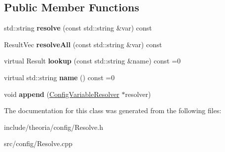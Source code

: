 \subsection*{Public Member Functions}
\begin{DoxyCompactItemize}
\item 
\hypertarget{classtheoria_1_1config_1_1ConfigVariableResolver_ad62f7d51564b8928aa7a1833395e5ddf}{std\+::string {\bfseries resolve} (const std\+::string \&var) const }\label{classtheoria_1_1config_1_1ConfigVariableResolver_ad62f7d51564b8928aa7a1833395e5ddf}

\item 
\hypertarget{classtheoria_1_1config_1_1ConfigVariableResolver_a4a0be04e0e88840dd93b09df855d54fd}{Result\+Vec {\bfseries resolve\+All} (const std\+::string \&var) const }\label{classtheoria_1_1config_1_1ConfigVariableResolver_a4a0be04e0e88840dd93b09df855d54fd}

\item 
\hypertarget{classtheoria_1_1config_1_1ConfigVariableResolver_a85e75133c0fdd67dd8b1d8e678f46ca8}{virtual Result {\bfseries lookup} (const std\+::string \&name) const =0}\label{classtheoria_1_1config_1_1ConfigVariableResolver_a85e75133c0fdd67dd8b1d8e678f46ca8}

\item 
\hypertarget{classtheoria_1_1config_1_1ConfigVariableResolver_a026bda729faf988eaef334a45ec92303}{virtual std\+::string {\bfseries name} () const =0}\label{classtheoria_1_1config_1_1ConfigVariableResolver_a026bda729faf988eaef334a45ec92303}

\item 
\hypertarget{classtheoria_1_1config_1_1ConfigVariableResolver_aedd40aea06645632c2b380c0181c563b}{void {\bfseries append} (\hyperlink{classtheoria_1_1config_1_1ConfigVariableResolver}{Config\+Variable\+Resolver} $\ast$resolver)}\label{classtheoria_1_1config_1_1ConfigVariableResolver_aedd40aea06645632c2b380c0181c563b}

\end{DoxyCompactItemize}


The documentation for this class was generated from the following files\+:\begin{DoxyCompactItemize}
\item 
include/theoria/config/Resolve.\+h\item 
src/config/Resolve.\+cpp\end{DoxyCompactItemize}
